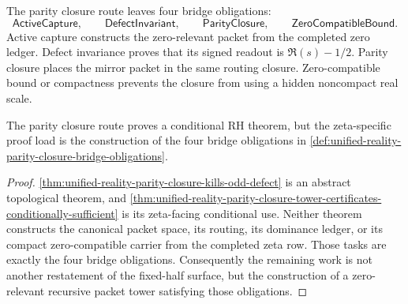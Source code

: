 \begin{definition}
\label{def:unified-reality-parity-closure-bridge-obligations}
The parity closure route leaves four bridge obligations:
$$
\mathsf{ActiveCapture},
\qquad
\mathsf{DefectInvariant},
\qquad
\mathsf{ParityClosure},
\qquad
\mathsf{ZeroCompatibleBound}.
$$
Active capture constructs the zero-relevant packet from the completed
zero ledger.  Defect invariance proves that its signed readout is
$\Re(s)-1/2$.  Parity closure places the mirror packet in the same
routing closure.  Zero-compatible bound or compactness prevents the
closure from using a hidden noncompact real scale.
\end{definition}

\begin{corollary}
\label{cor:unified-reality-parity-closure-bridge-obligations-proof-load}
The parity closure route proves a conditional RH theorem, but the
zeta-specific proof load is the construction of the four bridge
obligations in
\autoref{def:unified-reality-parity-closure-bridge-obligations}.
\end{corollary}

\begin{proof}
\autoref{thm:unified-reality-parity-closure-kills-odd-defect} is an
abstract topological theorem, and
\autoref{thm:unified-reality-parity-closure-tower-certificates-conditionally-sufficient}
is its zeta-facing conditional use.  Neither theorem constructs the
canonical packet space, its routing, its dominance ledger, or its compact
zero-compatible carrier from the completed zeta row.  Those tasks are
exactly the four bridge obligations.  Consequently the remaining work is
not another restatement of the fixed-half surface, but the construction
of a zero-relevant recursive packet tower satisfying those obligations.
\end{proof}
